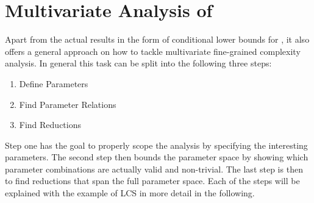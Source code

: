 \section{Multivariate Analysis of \lcs}
Apart from the actual results in the form of conditional lower bounds for \lcs{}, it also offers a general approach on how to tackle multivariate fine-grained complexity analysis.
In general this task can be split into the following three steps:
\begin{enumerate}
	\item Define Parameters
	\item Find Parameter Relations
	\item Find Reductions
\end{enumerate}
Step one has the goal to properly scope the analysis by specifying the interesting parameters.
The second step then bounds the parameter space by showing which parameter combinations are actually valid and non-trivial.
The last step is then to find reductions that span the full parameter space.
Each of the steps will be explained with the example of LCS in more detail in the following.










